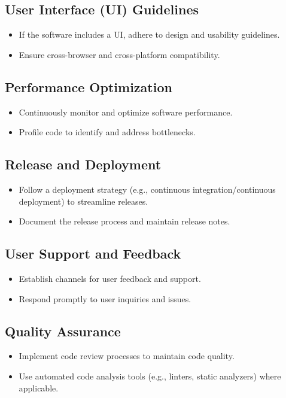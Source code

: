 \documentclass{article}
\begin{document}
\subsection{User Interface (UI) Guidelines}
\begin{itemize}
    \item If the software includes a UI, adhere to design and usability guidelines.
    \item Ensure cross-browser and cross-platform compatibility.
\end{itemize}

\subsection{Performance Optimization}
\begin{itemize}
    \item Continuously monitor and optimize software performance.
    \item Profile code to identify and address bottlenecks.
\end{itemize}

\subsection{Release and Deployment}
\begin{itemize}
    \item Follow a deployment strategy (e.g., continuous integration/continuous
        deployment) to streamline releases.
    \item Document the release process and maintain release notes.
\end{itemize}

\subsection{User Support and Feedback}
\begin{itemize}
    \item Establish channels for user feedback and support.
    \item Respond promptly to user inquiries and issues.
\end{itemize}

\subsection{Quality Assurance}
\begin{itemize}
    \item Implement code review processes to maintain code quality.
    \item Use automated code analysis tools (e.g., linters, static analyzers) where applicable.
\end{itemize}
\end{document}
